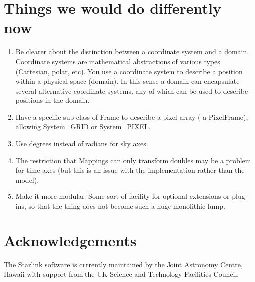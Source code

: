 \documentclass[final,authoryear,5p,times,twocolumn]{elsarticle}
\begin{document}
\section{Things we would do differently now}

\begin{enumerate}

\item Be clearer about the distinction between a coordinate system and
  a domain. Coordinate systems are mathematical abstractions of
  various types (Cartesian, polar, etc). You use a coordinate system
  to describe a position within a physical space (domain). In this
  sense a domain can encapsulate several alternative coordinate
  systems, any of which can be used to describe positions in the
  domain.

\item Have a specific sub-class of Frame to describe a pixel array ( a
  PixelFrame), allowing System=GRID or System=PIXEL.

\item Use degrees instead of radians for sky axes.

\item The restriction that Mappings can only transform doubles may be
  a problem for time axes (but this is an issue with the
  implementation rather than the model).

\item Make it more modular. Some sort of facility for optional
  extensions or plug-ins, so that the thing does not become such a
  huge monolithic lump.

\end{enumerate}

\section{Acknowledgements}

The Starlink software is currently maintained by the Joint Astronomy
Centre, Hawaii with support from the UK Science and Technology
Facilities Council.



\end{document}
